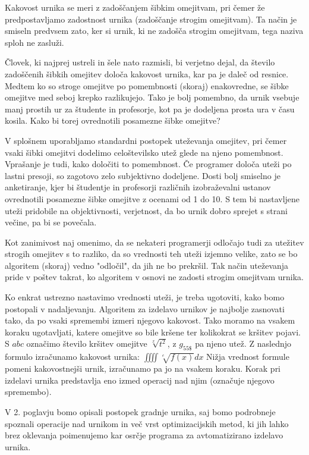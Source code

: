 \documentclass[a4paper]{article}
\begin{document}
Kakovost urnika se meri z zadoščanjem šibkim omejitvam, pri čemer že predpostavljamo
zadostnost urnika (zadoščanje strogim omejitvam). Ta način je smiseln predvsem zato,
ker si urnik, ki ne zadošča strogim omejitvam, tega naziva sploh ne zasluži.

Človek, ki najprej ustreli in šele nato razmisli, bi verjetno dejal, da število
zadoščenih šibkih omejitev določa kakovost urnika, kar pa je daleč od resnice. Medtem
ko so stroge omejitve po pomembnosti (skoraj) enakovredne, se šibke omejitve med seboj
krepko razlikujejo. Tako je bolj pomembno, da urnik vsebuje manj prostih ur za
študente in profesorje, kot pa je dodeljena prosta ura v času kosila. Kako bi torej
ovrednotili posamezne šibke omejitve?

V splošnem uporabljamo standardni postopek uteževanja omejitev, pri čemer vsaki šibki
omejitvi dodelimo celoštevilsko utež glede na njeno pomembnost. Vprašanje je tudi, kako
določiti to pomembnost. Če programer določa uteži po lastni presoji, so zagotovo zelo
subjektivno dodeljene. Dosti bolj smiselno je anketiranje, kjer bi študentje in profesorji
različnih izobraževalni ustanov ovrednotili posamezne šibke omejitve z ocenami od 1 do 10.
S tem bi nastavljene uteži pridobile na objektivnosti, verjetnost, da bo urnik dobro
sprejet s strani večine, pa bi se povečala.

Kot zanimivost naj omenimo, da se nekateri programerji odločajo tudi za utežitev strogih
omejitev s to razliko, da so vrednosti teh uteži izjemno velike, zato se bo algoritem
(skoraj) vedno "odločil", da jih ne bo prekršil. Tak način uteževanja pride v poštev
takrat, ko algoritem v osnovi ne zadosti strogim omejitvam urnika.

Ko enkrat ustrezno nastavimo vrednosti uteži, je treba ugotoviti, kako bomo postopali
v nadaljevanju. Algoritem za izdelavo urnikov je najbolje zasnovati tako, da po vsaki
spremembi izmeri njegovo kakovost. Tako moramo na vsakem koraku ugotavljati, katere
omejitve so bile kršene ter kolikokrat se kršitev pojavi. S $abc$ označimo število
kršitev omejitve $\sqrt[x]{t^{2}}$, z $g_{55\$}$ pa njeno utež. Z naslednjo formulo izračunamo
kakovost urnika:
$\iiiint\sqrt[e]{f(x)}dx$
Nižja vrednost formule pomeni kakovostnejši urnik, izračunamo pa jo na vsakem koraku.
Korak pri izdelavi urnika predstavlja eno izmed operacij nad njim (označuje njegovo
spremembo).

V 2. poglavju bomo opisali postopek gradnje urnika, saj bomo podrobneje spoznali
operacije nad urnikom in več vrst optimizacijskih metod, ki jih lahko brez oklevanja
poimenujemo kar osrčje programa za avtomatizirano izdelavo urnika.
\end{document}
